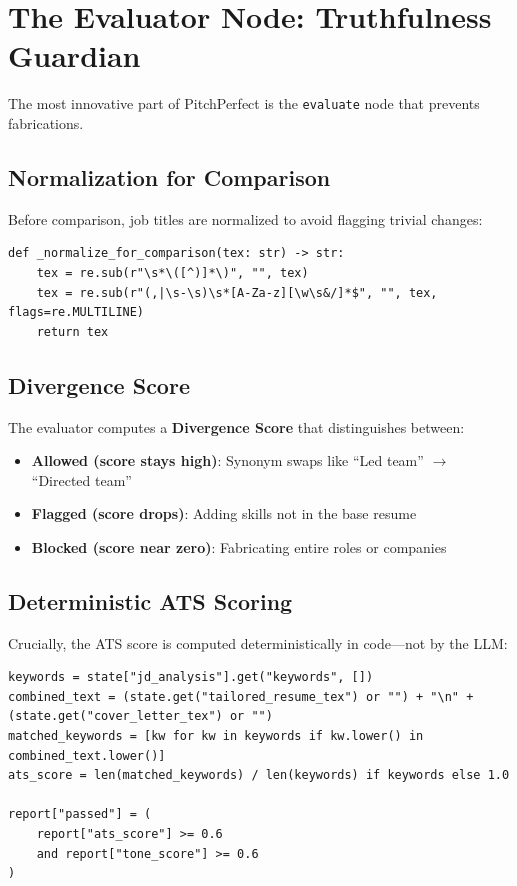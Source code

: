 \documentclass[12pt, a4paper]{article}
\begin{document}
\newpage

\section{The Evaluator Node: Truthfulness Guardian}

The most innovative part of PitchPerfect is the \texttt{evaluate} node that prevents fabrications.

\subsection{Normalization for Comparison}

Before comparison, job titles are normalized to avoid flagging trivial changes:

\begin{verbatim}
def _normalize_for_comparison(tex: str) -> str:
    tex = re.sub(r"\s*\([^)]*\)", "", tex)
    tex = re.sub(r"(,|\s-\s)\s*[A-Za-z][\w\s&/]*$", "", tex, flags=re.MULTILINE)
    return tex
\end{verbatim}

\subsection{Divergence Score}

The evaluator computes a \textbf{Divergence Score} that distinguishes between:

\begin{itemize}
    \item \textbf{Allowed (score stays high)}: Synonym swaps like ``Led team'' $\rightarrow$ ``Directed team''
    \item \textbf{Flagged (score drops)}: Adding skills not in the base resume
    \item \textbf{Blocked (score near zero)}: Fabricating entire roles or companies
\end{itemize}

\subsection{Deterministic ATS Scoring}

Crucially, the ATS score is computed deterministically in code---not by the LLM:

\begin{verbatim}
keywords = state["jd_analysis"].get("keywords", [])
combined_text = (state.get("tailored_resume_tex") or "") + "\n" + (state.get("cover_letter_tex") or "")
matched_keywords = [kw for kw in keywords if kw.lower() in combined_text.lower()]
ats_score = len(matched_keywords) / len(keywords) if keywords else 1.0

report["passed"] = (
    report["ats_score"] >= 0.6
    and report["tone_score"] >= 0.6
)
\end{verbatim}
\end{document}
